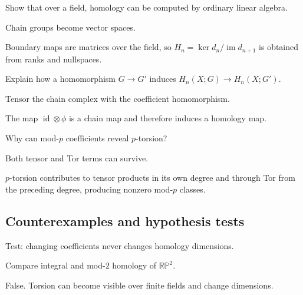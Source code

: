 \begin{exercise}\label{exr:viii25-ped-07}
Show that over a field, homology can be computed by ordinary linear algebra.
\end{exercise}
\begin{hint}
Chain groups become vector spaces.
\end{hint}
\begin{solution}
Boundary maps are matrices over the field, so $H_n=\ker d_n/\operatorname{im}d_{n+1}$ is obtained from ranks and nullspaces.
\end{solution}

\begin{exercise}\label{exr:viii25-ped-08}
Explain how a homomorphism $G\to G'$ induces $H_n(X;G)\to H_n(X;G')$.
\end{exercise}
\begin{hint}
Tensor the chain complex with the coefficient homomorphism.
\end{hint}
\begin{solution}
The map $\operatorname{id}\otimes\phi$ is a chain map and therefore induces a homology map.
\end{solution}

\begin{exercise}\label{exr:viii25-ped-09}
Why can mod-$p$ coefficients reveal $p$-torsion?
\end{exercise}
\begin{hint}
Both tensor and Tor terms can survive.
\end{hint}
\begin{solution}
$p$-torsion contributes to tensor products in its own degree and through Tor from the preceding degree, producing nonzero mod-$p$ classes.
\end{solution}

\subsection*{Counterexamples and hypothesis tests}

\begin{exercise}\label{exr:viii25-ped-10}
Test: changing coefficients never changes homology dimensions.
\end{exercise}
\begin{hint}
Compare integral and mod-$2$ homology of $\mathbb{RP}^2$.
\end{hint}
\begin{solution}
False. Torsion can become visible over finite fields and change dimensions.
\end{solution}

